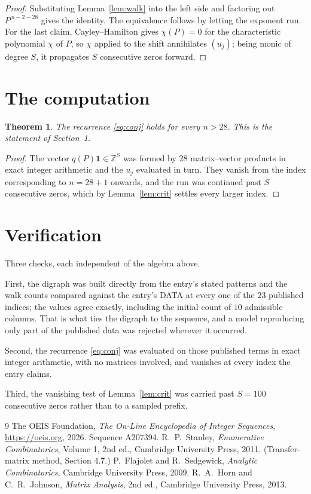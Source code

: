 \documentclass[11pt,a4paper]{article}
\theoremstyle{plain}
\newtheorem{theorem}{Theorem}
\theoremstyle{definition}
\begin{document}
\begin{proof}
Substituting Lemma~\ref{lem:walk} into the left side and factoring out
$P^{\,n-2-28}$ gives the identity. The equivalence follows by letting the exponent
run. For the last claim, Cayley--Hamilton gives $\chi(P)=0$ for the characteristic
polynomial $\chi$ of $P$, so $\chi$ applied to the shift annihilates $(u_j)$; being monic of
degree $S$, it propagates $S$ consecutive zeros forward.
\end{proof}

\section{The computation}

\begin{theorem}
The recurrence \eqref{eq:conj} holds for every $n>28$. This is the statement of
Section~1.
\end{theorem}

\begin{proof}
The vector $q(P)\mathbf{1}\in\mathbb{Z}^{S}$ was formed by $28$ matrix--vector
products in exact integer arithmetic and the $u_j$ evaluated in turn. They vanish from the
index corresponding to $n=28+1$ onwards, and the run was continued past $S$ consecutive
zeros, which by Lemma~\ref{lem:crit} settles every larger index.
\end{proof}

\section{Verification}

Three checks, each independent of the algebra above.

First, the digraph was built directly from the entry's stated patterns and the walk counts
compared against the entry's DATA at every one of the $23$ published indices; the
values agree exactly, including the initial count of $10$ admissible columns. That is
what ties the digraph to the sequence, and a model reproducing only part of the published
data was rejected wherever it occurred.

Second, the recurrence \eqref{eq:conj} was evaluated on those published terms in exact
integer arithmetic, with no matrices involved, and vanishes at every index the entry claims.

Third, the vanishing test of Lemma~\ref{lem:crit} was carried past $S=100$ consecutive
zeros rather than to a sampled prefix.

\begin{thebibliography}{9}
 The OEIS Foundation, \emph{The On-Line Encyclopedia of Integer
Sequences}, \url{https://oeis.org}, 2026. Sequence A207394.
 R.~P.~Stanley, \emph{Enumerative Combinatorics}, Volume 1, 2nd ed.,
Cambridge University Press, 2011. (Transfer-matrix method, Section 4.7.)
 P.~Flajolet and R.~Sedgewick, \emph{Analytic Combinatorics}, Cambridge
University Press, 2009.
 R.~A.~Horn and C.~R.~Johnson, \emph{Matrix Analysis}, 2nd ed., Cambridge
University Press, 2013.
\end{thebibliography}
\end{document}

